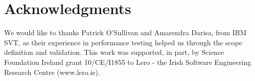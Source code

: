 \documentclass[runningheads,a4paper]{llncs}
\newcommand{\myspaceM}{-7.6pt}
\begin{document}
\vspace{\myspaceM{}}
\section*{Acknowledgments}
\vspace{\myspaceM{}}
We would like to thanks Patrick O'Sullivan and Amarendra Darisa, from IBM SVT,
as their experience in performance testing helped us through the scope
definition and validation. This work was supported, in part, by Science
Foundation Ireland grant 10/CE/I1855 to Lero - the Irish Software Engineering
Research Centre (www.lero.ie).

\vspace{\myspaceM{}}



\end{document}

